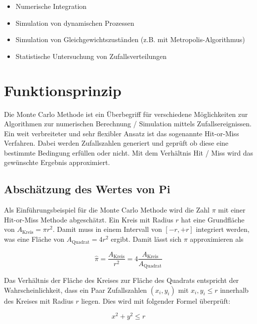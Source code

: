 \documentclass{book}
\begin{document}
\begin{refsection}
\begin{itemize}
	\item Numerische Integration
	\item Simulation von dynamischen Prozessen
	\item Simulation von Gleichgewichtszuständen (z.B. mit Metropolis-Algorithmus)
	\item Statistische Untersuchung von Zufallsverteilungen
\end{itemize}

\section{Funktionsprinzip}
Die Monte Carlo Methode ist ein Überbegriff für verschiedene Möglichkeiten zur Algorithmen zur numerischen Berechnung / Simulation mittels Zufallsereignissen. Ein weit verbreiteter und sehr flexibler Ansatz ist das sogenannte Hit-or-Miss Verfahren. Dabei werden Zufallszahlen generiert und geprüft ob diese eine bestimmte Bedingung erfüllen oder nicht. Mit dem Verhältnis Hit / Miss wird das gewünschte Ergebnis approximiert. 

\subsection{Abschätzung des Wertes von Pi}
Als Einführungsbeispiel für die Monte Carlo Methode wird die Zahl $\pi$ mit einer Hit-or-Miss Methode abgeschätzt. Ein Kreis mit Radius $r$ hat eine Grundfläche von $A_{\text{Kreis}} = \pi r^{2}$.  Damit muss in einem Intervall von $[-r,+r]$ integriert werden, was eine Fläche von $A_{\text{Quadrat}} = 4r^2$ ergibt. Damit lässt sich $\pi$ approximieren als

\begin{equation}
	\hat{\pi} = \frac{A_{\text{Kreis}}}{r^2} = 4 \frac{A_{\text{Kreis}}}{A_{\text{Quadrat}}}
\end{equation}

Das Verhältnis der Fläche des Kreises zur Fläche des Quadrats entspricht der Wahrscheinlichkeit, dass ein Paar Zufallszahlen $(x_i,y_i)$ mit $x_i,y_i \leq r$ innerhalb des Kreises mit Radius $r$ liegen. Dies wird mit folgender Formel überprüft:

\begin{equation}
	x^2 + y^2 \leq r
	\label{equ:innerhalbKreis}
\end{equation}


\end{refsection}
\end{document}
